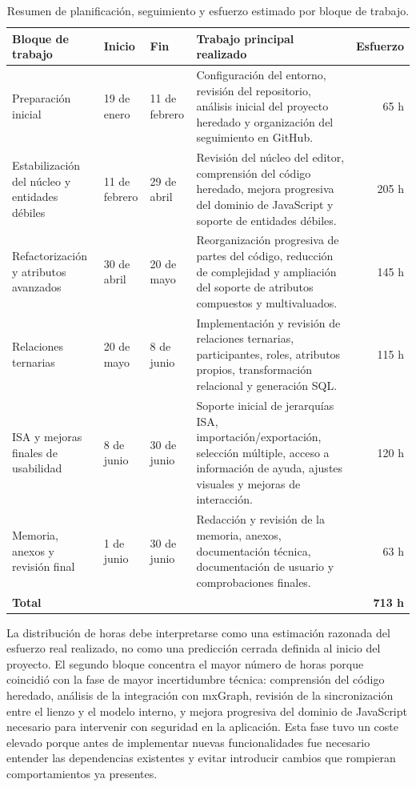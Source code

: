 \begin{table}[H]
\centering
\small
\renewcommand{\arraystretch}{1.2}
\begin{tabular}{p{} p{} p{} p{} r}
\toprule
\textbf{Bloque de trabajo} & \textbf{Inicio} & \textbf{Fin} & \textbf{Trabajo principal realizado} & \textbf{Esfuerzo} \tabularnewline
\midrule
Preparación inicial & 19 de enero & 11 de febrero & Configuración del entorno, revisión del repositorio, análisis inicial del proyecto heredado y organización del seguimiento en GitHub. & 65 h \tabularnewline
Estabilización del núcleo y entidades débiles & 11 de febrero & 29 de abril & Revisión del núcleo del editor, comprensión del código heredado, mejora progresiva del dominio de JavaScript y soporte de entidades débiles. & 205 h \tabularnewline
Refactorización y atributos avanzados & 30 de abril & 20 de mayo & Reorganización progresiva de partes del código, reducción de complejidad y ampliación del soporte de atributos compuestos y multivaluados. & 145 h \tabularnewline
Relaciones ternarias & 20 de mayo & 8 de junio & Implementación y revisión de relaciones ternarias, participantes, roles, atributos propios, transformación relacional y generación SQL. & 115 h \tabularnewline
ISA y mejoras finales de usabilidad & 8 de junio & 30 de junio & Soporte inicial de jerarquías ISA, importación/exportación, selección múltiple, acceso a información de ayuda, ajustes visuales y mejoras de interacción. & 120 h \tabularnewline
Memoria, anexos y revisión final & 1 de junio & 30 de junio & Redacción y revisión de la memoria, anexos, documentación técnica, documentación de usuario y comprobaciones finales. & 63 h \tabularnewline
\midrule
\textbf{Total} & & & & \textbf{713 h} \tabularnewline
\bottomrule
\end{tabular}
\caption{Resumen de planificación, seguimiento y esfuerzo estimado por bloque de trabajo.}
\label{tab:resumen_planificacion_esfuerzo}
\end{table}

La distribución de horas debe interpretarse como una estimación razonada del esfuerzo real realizado, no como una predicción cerrada definida al inicio del proyecto. El segundo bloque concentra el mayor número de horas porque coincidió con la fase de mayor incertidumbre técnica: comprensión del código heredado, análisis de la integración con mxGraph, revisión de la sincronización entre el lienzo y el modelo interno, y mejora progresiva del dominio de JavaScript necesario para intervenir con seguridad en la aplicación. Esta fase tuvo un coste elevado porque antes de implementar nuevas funcionalidades fue necesario entender las dependencias existentes y evitar introducir cambios que rompieran comportamientos ya presentes.

